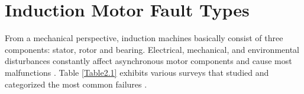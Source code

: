 

\section{Induction Motor Fault Types}

From a mechanical perspective, induction machines basically consist of three components: stator, rotor and bearing. Electrical, mechanical, and environmental disturbances constantly affect asynchronous motor components and cause most malfunctions \cite{bonnet2010}. Table \ref{Table2.1} exhibits various surveys that studied and categorized the most common failures \cite{motor1985report,albrecht1986assessment,albrecht1987assessment,thorsen1995survey,bonnett2008increased}. 

